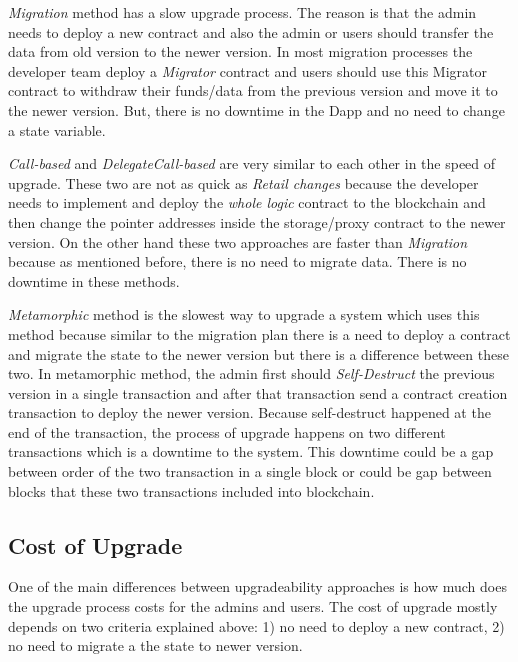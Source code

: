 \textit{Migration} method has a slow upgrade process. The reason is that the admin needs to deploy a new contract and also the admin or users should transfer the data from old version to the newer version. In most migration processes the developer team deploy a \textit{Migrator} contract and users should use this Migrator contract to withdraw their funds/data from the previous version and move it to the newer version. But, there is no downtime in the Dapp and no need to change a state variable.

\textit{Call-based} and \textit{DelegateCall-based} are very similar to each other in the speed of upgrade. These two are not as quick as \textit{Retail changes} because the developer needs to implement and deploy the \textit{whole logic} contract to the blockchain and then change the pointer addresses inside the storage/proxy contract to the newer version.
On the other hand these two approaches are faster than \textit{Migration} because as mentioned before, there is no need to migrate data. There is no downtime in these methods.

\textit{Metamorphic} method is the slowest way to upgrade a system which uses this method because similar to the migration plan there is a need to deploy a contract and migrate the state to the newer version but there is a difference between these two. In metamorphic method, the admin first should \textit{Self-Destruct} the previous version in a single transaction and after that transaction send a contract creation transaction to deploy the newer version. Because self-destruct happened at the end of the transaction, the process of upgrade happens on two different transactions which is a downtime to the system. This downtime could be a gap between order of the two transaction in a single block or could be gap between blocks that these two transactions included into blockchain. 


\subsection{Cost of Upgrade}

 One of the main differences between upgradeability approaches is how much does the upgrade process costs for the admins and users. The cost of upgrade mostly depends on two criteria explained above: 1) no need to deploy a new contract, 2) no need to migrate a the state to newer version.

